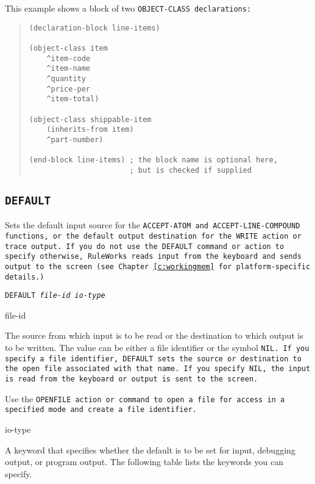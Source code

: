 \Example

This example shows a block of two \tt{OBJECT-CLASS} declarations:
\begin{quote}
\begin{verbatim}
(declaration-block line-items)

(object-class item
    ^item-code
    ^item-name
    ^quantity
    ^price-per
    ^item-total)

(object-class shippable-item
    (inherits-from item)
    ^part-number)

(end-block line-items) ; the block name is optional here,
                       ; but is checked if supplied
\end{verbatim}
\end{quote}
                    
\subsection{\tt{DEFAULT}}

Sets the default input source for the \tt{ACCEPT-ATOM} and
\tt{ACCEPT-LINE-COMPOUND} functions, or the default output destination
for the \tt{WRITE} action or trace output. If you do not use the
\tt{DEFAULT} command or action to specify otherwise, RuleWorks reads
input from the keyboard and sends output to the screen (see Chapter~\ref{c:workingmem} for platform-specific details.)

\Format

\tt{DEFAULT} \it{file-id} \it{io-type}

\begin{arguments}
\item[file-id]

  The source from which input is to be read or the destination to
  which output is to be written. The value can be either a file
  identifier or the symbol \tt{NIL}. If you specify a file identifier,
  \tt{DEFAULT} sets the source or destination to the open file
  associated with that name. If you specify \tt{NIL}, the input is
  read from the keyboard or output is sent to the screen.

  Use the \tt{OPENFILE} action or command to open a file for access in
  a specified mode and create a file identifier.

\item[io-type]

  A keyword that specifies whether the default is to be set for input,
  debugging output, or program output. The following table lists the
  keywords you can specify.
\end{arguments}

